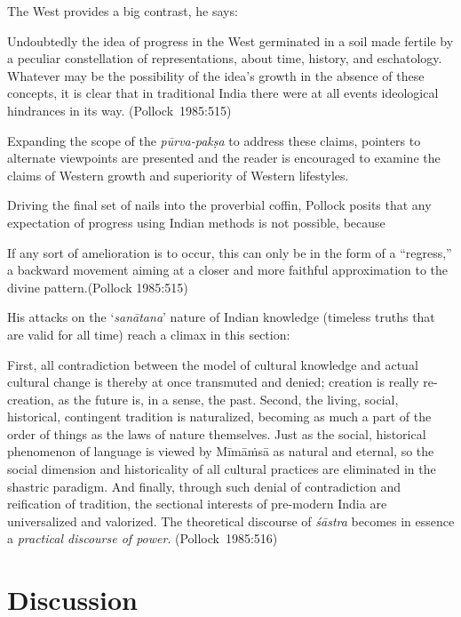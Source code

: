 The West provides a big contrast, he says: 
\begin{myquote}
Undoubtedly the idea of progress in the West germinated in a soil made fertile by a peculiar constellation of representations, about time, history, and eschatology. Whatever may be the possibility of the idea's growth in the absence of these concepts, it is clear that in traditional India there were at all events ideological hindrances in its way.	
\hfill \hbox{(Pollock 1985:515)}
\end{myquote}

Expanding the scope of the {\sl pūrva-pakṣa} to address these claims, pointers to alternate viewpoints are presented and the reader is encouraged to examine the claims of Western growth and superiority of Western lifestyles. 

Driving the final set of nails into the proverbial coffin, Pollock posits that any expectation of progress using Indian methods is not possible, because
\begin{myquote}
If any sort of amelioration is to occur, this can only be in the form of a ``regress,'' a backward movement aiming at a closer and more faithful approximation to the divine pattern.\hfill (Pollock 1985:515)
\end{myquote}

His attacks on the `{\sl sanātana}' nature of Indian knowledge (timeless truths that are valid for all time) reach a climax in this section:
\begin{myquote}
First, all contradiction between the model of cultural knowledge and actual cultural change is thereby at once transmuted and denied; creation is really re-creation, as the future is, in a sense, the past. Second, the living, social, historical, contingent tradition is naturalized, becoming as much a part of the order of things as the laws of nature themselves. Just as the social, historical phenomenon of language is viewed by Mīmāṁsā as natural and eternal, so the social dimension and historicality of all cultural practices are eliminated in the shastric paradigm. And finally, through such denial of contradiction and reification of tradition, the sectional interests of pre-modern India are universalized and valorized. The theoretical discourse of {\sl śāstra} becomes in essence a {\sl practical discourse of power}.
\hfill \hbox{(Pollock 1985:516)}
\end{myquote}

\section*{Discussion}

